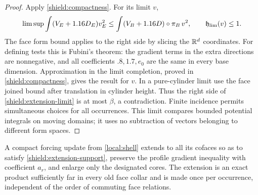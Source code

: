 \begin{proof}
Apply \cref{shield:compactness}.  For its limit $v$,
\begin{equation}\label{shield:extension-limit}
 \limsup\int(V_E+1.16D_E)v_E^2
 \le\int(V_B+1.16D)\circ\pi_B\,v^2,
 \qquad \mathfrak h_{\rm lim}(v)\le1.
\end{equation}
The face form bound applies to the right side by slicing the $\mathbb R^d$
coordinates.  For defining tests this is Fubini's theorem: the gradient
terms in the extra directions are nonnegative, and all coefficients
$.8,1.7,e_0$ are the same in every base dimension.  Approximation in the
limit completion, proved in \cref{shield:compactness}, gives the result
for $v$.  In a pure-cylinder limit use the face joined bound after
translation in cylinder height.  Thus the right side of
\cref{shield:extension-limit} is at most $\beta$, a contradiction.
Finite incidence permits simultaneous choices for all occurrences.
This limit compares bounded potential integrals on moving domains;
it uses no subtraction of vectors belonging to different form spaces.
\end{proof}

\begin{lemma}\label{shield:caps}
A compact forcing update from \cref{local:shell} extends to all its
cofaces so as to satisfy \cref{shield:extension-support}, preserve the
profile gradient inequality with coefficient $a_r$, and enlarge only
the designated cores.  The extension is an exact product sufficiently
far in every old face collar and is made once per occurrence, independent
of the order of commuting face relations.
\end{lemma}

